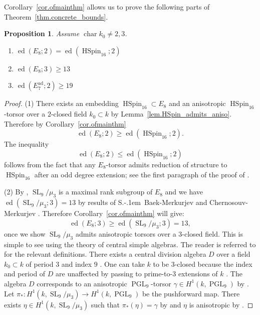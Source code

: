 \documentclass[12pt]{amsart}
\numberwithin{equation}{section}
\newtheorem{proposition}[theorem]{Proposition}
\theoremstyle{definition}
\newcommand{\ad}{\mathrm{ad}}
\newcommand{\PGL}{\operatorname{PGL}}
\newcommand{\SL}{\operatorname{SL}}
\newcommand{\ed}{\operatorname{ed}}
\newcommand{\Char}{\operatorname{char}}
\newcommand{\HSpin}{\operatorname{HSpin}}
\begin{document}
Corollary~\ref{cor.ofmainthm} allows us to prove the following parts of Theorem~\ref{thm.concrete_bounds}.
\begin{proposition}\label{prop.partofconcreteboundsthm1}
    Assume $\Char k_0 \neq 2,3$. 
    \begin{enumerate}
        \item $\ed(E_8;2) = \ed(\HSpin_{16};2)$
        \item $\ed(E_8;3) \geq 13$
        \item $\ed(E_7^{\ad};2) \geq 19$
    \end{enumerate}
\end{proposition}
\begin{proof}
     (1) There exists an embedding $\HSpin_{16}\subset E_8$ \cite[Example 4.3]{garibaldi2016E8} and an anisotropic $\HSpin_{16}$-torsor over a $2$-closed field $k_0\subset k$ by Lemma~\ref{lem.HSpin_admits_aniso}. Therefore by Corollary~\ref{cor.ofmainthm} $$\ed(E_8;2)\geq \ed(\HSpin_{16};2).$$ The inequality
    $$\ed(E_8;2)\leq \ed(\HSpin_{16};2)$$
    follows from the fact that any $E_8$-torsor admits reduction of structure to $\HSpin_{16}$ after an odd degree extension; see the first paragraph of the proof of \cite[Theorem 16.2]{garibaldi2016E8}.

    \smallskip
    (2) By \cite[Example 4.4]{garibaldi2016E8}, $\SL_9/\mu_3$ is a maximal rank subgroup of $E_8$ and we have $ \ed(\SL_9/\mu_3;3) = 13$ by results of S.\kern-.1em\ Baek-Merkurjev \cite{baek2012essential} and Chernosouv-Merkurjev \cite[Theorem 1.1]{chernousov2013essential}. Therefore Corollary~\ref{cor.ofmainthm} will give:
    $$\ed(E_8;3) \geq \ed(\SL_9/\mu_3;3) = 13,$$
    once we show $\SL_9/\mu_3$ admits anisotropic torsors over a $3$-closed field. This is simple to see using the theory of central simple algebras. The reader is referred to \cite{gille_szamuely_2006} for the relevant definitions.
    There exists a central division algebra $D$ over a field $k_0\subset k$ of period $3$ and index $9$ \cite[Lemma 4.8]{ofek2022reduction}. One can take $k$ to be $3$-closed because the index and period of $D$ are unaffected by passing to prime-to-$3$ extensions of $k$ \cite[Theorem 3.15]{saltman1999lectures}. The algebra $D$ corresponds to an anisotropic $\PGL_9$-torsor $\gamma \in H^1(k,\PGL_9)$ by \cite[Lemma 5.4]{ofek2022reduction}. Let $\pi_*: H^1(k,\SL_9/\mu_3) \to H^1(k,\PGL_9)$ be the pushforward map. There exists $\eta\in H^1(k,\SL_9/\mu_3)$ such that $\pi_*(\eta) = \gamma$  by \cite[Lemma 5.3]{ofek2022reduction} and $\eta$ is anisotropic by \cite[Corollary 3.4]{ofek2022reduction}. 


\end{proof}
\end{document}
